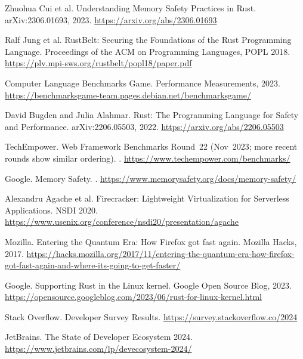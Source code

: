 \documentclass[11pt]{article}
\begin{document}
\begin{thebibliography}{99}
Zhuohua Cui et al.
\newblock Understanding Memory Safety Practices in Rust.
\newblock arXiv:2306.01693, 2023.
\newblock \url{https://arxiv.org/abs/2306.01693}

Ralf Jung et al.
\newblock RustBelt: Securing the Foundations of the Rust Programming Language.
\newblock Proceedings of the ACM on Programming Languages, POPL 2018.
\newblock \url{https://plv.mpi-sws.org/rustbelt/popl18/paper.pdf}

Computer Language Benchmarks Game.
\newblock Performance Measurements, 2023.
\newblock \url{https://benchmarksgame-team.pages.debian.net/benchmarksgame/}

David Bugden and Julia Alahmar.
\newblock Rust: The Programming Language for Safety and Performance.
\newblock arXiv:2206.05503, 2022.
\newblock \url{https://arxiv.org/abs/2206.05503}

TechEmpower.
\newblock Web Framework Benchmarks Round 22 (Nov 2023; more recent rounds show similar ordering).
.
\newblock \url{https://www.techempower.com/benchmarks/}

Google.
\newblock Memory Safety.
.
\newblock \url{https://www.memorysafety.org/docs/memory-safety/}

Alexandru Agache et al.
\newblock Firecracker: Lightweight Virtualization for Serverless Applications.
\newblock NSDI 2020.
\newblock \url{https://www.usenix.org/conference/nsdi20/presentation/agache}

Mozilla.
\newblock Entering the Quantum Era: How Firefox got fast again.
\newblock Mozilla Hacks, 2017.
\newblock \url{https://hacks.mozilla.org/2017/11/entering-the-quantum-era-how-firefox-got-fast-again-and-where-its-going-to-get-faster/}

Google.
\newblock Supporting Rust in the Linux kernel.
\newblock Google Open Source Blog, 2023.
\newblock \url{https://opensource.googleblog.com/2023/06/rust-for-linux-kernel.html}

Stack Overflow.
 Developer Survey Results.
\newblock \url{https://survey.stackoverflow.co/2024}

JetBrains.
\newblock The State of Developer Ecosystem 2024.
\newblock \url{https://www.jetbrains.com/lp/devecosystem-2024/}


\end{thebibliography}
\end{document}
